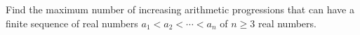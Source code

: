 Find the maximum number of increasing arithmetic progressions that can have a finite sequence of real numbers $a_1<a_2<\cdots<a_n$ of $n\ge 3$ real numbers.